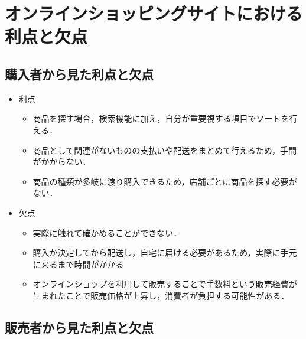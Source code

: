 \newpage








\section{オンラインショッピングサイトにおける利点と欠点}

\subsection{購入者から見た利点と欠点}

\begin{itemize}
 \item	利点
\begin{itemize}
\setlength{\parskip}{3mm}
 \item	商品を探す場合，検索機能に加え，自分が重要視する項目でソートを行える．
 \item	商品として関連がないものの支払いや配送をまとめて行えるため，手間がかからない．
 \item	商品の種類が多岐に渡り購入できるため，店舗ごとに商品を探す必要がない．

\end{itemize}


 \item	欠点
\begin{itemize}
\setlength{\parskip}{3mm}
 \item	実際に触れて確かめることができない．
 \item	購入が決定してから配送し，自宅に届ける必要があるため，実際に手元に来るまで時間がかかる
 \item	オンラインショップを利用して販売することで手数料という販売経費が生まれたことで販売価格が上昇し，消費者が負担する可能性がある．

\end{itemize}

\end{itemize}



\subsection{販売者から見た利点と欠点}

